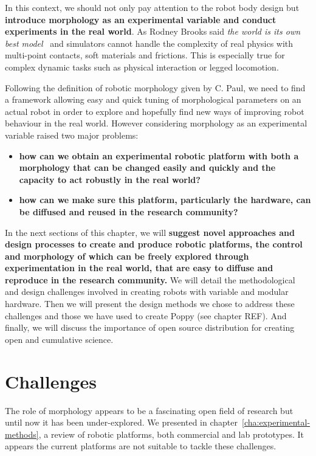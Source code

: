 In this context, we should not only pay attention to the robot body design but \textbf{introduce morphology as an experimental variable and conduct experiments in the real world}. As Rodney Brooks said \emph{the world is its own best model}~\parencite{brooks1991intelligence} and simulators cannot handle the complexity of real physics with multi-point contacts, soft materials and frictions. This is especially true for complex dynamic tasks such as physical interaction or legged locomotion.

Following the definition of robotic morphology given by C. Paul, we need to find a framework allowing easy and quick tuning of morphological parameters on an actual robot in order to explore and hopefully find new ways of improving robot behaviour in the real world. However considering morphology as an experimental variable raised two major problems:
\begin{itemize}
    \item \textbf{how can we obtain an experimental robotic platform with both a morphology that can be changed easily and quickly and the capacity to act robustly in the real world? }
    \item \textbf{how can we make sure this platform, particularly the hardware,  can be diffused and reused in the research community?}
\end{itemize}

In the next sections of this chapter, we will \textbf{suggest novel approaches and design processes to create and produce robotic platforms,  the control and morphology of which can be freely explored through experimentation in the real world,  that are easy to  diffuse and reproduce in the research community.}
We will detail the methodological and design challenges involved in creating robots with variable and modular hardware. Then we will present the design methods we chose to address these challenges and those we have used to create Poppy (see chapter REF). And finally, we will discuss the importance of open source distribution for creating open and cumulative science.


\section{Challenges} %

The role of morphology appears to be a fascinating open field of research but until now it has been under-explored.
We presented in chapter~\ref{cha:experimental-methods}, a review of robotic platforms, both commercial and lab prototypes. It appears the current platforms are not suitable to tackle these challenges.

